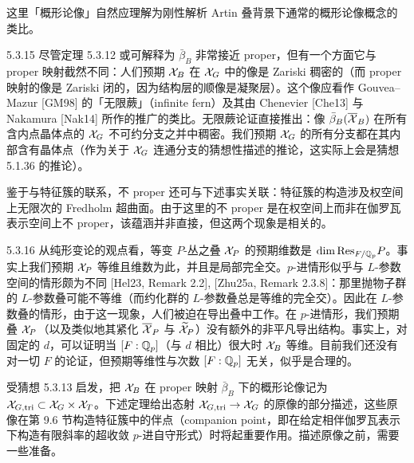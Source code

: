 这里「概形论像」自然应理解为刚性解析 Artin 叠背景下通常的概形论像概念的类比。


\begin{rem}{5.3.15}\label{rem:a4-5-3-15}
尽管定理 5.3.12 或可解释为 $\bar\beta_B$ 非常接近 proper，但有一个方面它与 proper 映射截然不同：人们预期 $\mathcal{X}_B$ 在 $\mathcal{X}_G$ 中的像是 Zariski 稠密的（而 proper 映射的像是 Zariski 闭的，因为结构层的顺像是凝聚层）。这个像应看作 Gouvea–Mazur [GM98] 的「无限蕨」（infinite fern）及其由 Chenevier [Che13] 与 Nakamura [Nak14] 所作的推广的类比。无限蕨论证直接推出：像 $\bar\beta_B(\overline{\mathcal{X}}_B)$ 在所有含内点晶体点的 $\mathcal{X}_G$ 不可约分支之并中稠密。我们预期 $\mathcal{X}_G$ 的所有分支都在其内部含有晶体点（作为关于 $\mathcal{X}_G$ 连通分支的猜想性描述的推论，这实际上会是猜想 5.1.36 的推论）。

鉴于与特征簇的联系，不 proper 还可与下述事实关联：特征簇的构造涉及权空间上无限次的 Fredholm 超曲面。由于这里的不 proper 是在权空间上而非在伽罗瓦表示空间上不 proper，该蕴涵并非直接，但这两个现象是相关的。
\end{rem}

\begin{rem}{5.3.16}\label{rem:a4-5-3-16}
从纯形变论的观点看，等变 $P$-丛之叠 $\mathcal{X}_P$ 的预期维数是 $\dim\mathrm{Res}_{F/\mathbb{Q}_p}P$。事实上我们预期 $\mathcal{X}_P$ 等维且维数为此，并且是局部完全交。$p$-进情形似乎与 $L$-参数空间的情形颇为不同 [Hel23, Remark 2.2], [Zhu25a, Remark 2.3.8]：那里抛物子群的 $L$-参数叠可能不等维（而约化群的 $L$-参数叠总是等维的完全交）。因此在 $L$-参数叠的情形，由于这一现象，人们被迫在导出叠中工作。在 $p$-进情形，我们预期叠 $\mathcal{X}_P$（以及类似地其紧化 $\overline{\mathcal{X}}_P$ 与 $\widetilde{\mathcal{X}}_P$）没有额外的非平凡导出结构。事实上，对固定的 $d$，可以证明当 $[F:\mathbb{Q}_p]$（与 $d$ 相比）很大时 $\mathcal{X}_B$ 等维。目前我们还没有对一切 $F$ 的论证，但预期等维性与次数 $[F:\mathbb{Q}_p]$ 无关，似乎是合理的。
\end{rem}

受猜想 5.3.13 启发，把 $\mathcal{X}_B$ 在 proper 映射 $\bar\beta_B$ 下的概形论像记为 $\mathcal{X}_{G,\mathrm{tri}}\subset\mathcal{X}_G\times\mathcal{X}_T$。下述定理给出态射 $\mathcal{X}_{G,\mathrm{tri}}\to\mathcal{X}_G$ 的原像的部分描述，这些原像在第 9.6 节构造特征簇中的伴点（companion point，即在给定相伴伽罗瓦表示下构造有限斜率的超收敛 $p$-进自守形式）时将起重要作用。描述原像之前，需要一些准备。

